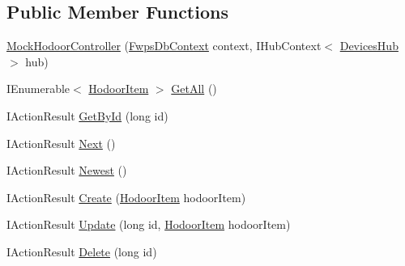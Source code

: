 \subsection*{Public Member Functions}
\begin{DoxyCompactItemize}
\item 
\mbox{\hyperlink{class_f_w_p_s_1_1_controllers_1_1_mock_hodoor_controller_a806d4077ea51a5692392f90fb0da6384}{Mock\+Hodoor\+Controller}} (\mbox{\hyperlink{class_f_w_p_s_1_1_data_1_1_fwps_db_context}{Fwps\+Db\+Context}} context, I\+Hub\+Context$<$ \mbox{\hyperlink{class_f_w_p_s_1_1_devices_hub}{Devices\+Hub}} $>$ hub)
\item 
I\+Enumerable$<$ \mbox{\hyperlink{class_f_w_p_s_1_1_models_1_1_hodoor_item}{Hodoor\+Item}} $>$ \mbox{\hyperlink{class_f_w_p_s_1_1_controllers_1_1_mock_hodoor_controller_a503cc2c82dc1892cc9c0358054b6b5df}{Get\+All}} ()
\item 
I\+Action\+Result \mbox{\hyperlink{class_f_w_p_s_1_1_controllers_1_1_mock_hodoor_controller_add58a70760f00b53f829d93057e7cff0}{Get\+By\+Id}} (long id)
\item 
I\+Action\+Result \mbox{\hyperlink{class_f_w_p_s_1_1_controllers_1_1_mock_hodoor_controller_a58c25ec4850b5c078ba684d3c5c18341}{Next}} ()
\item 
I\+Action\+Result \mbox{\hyperlink{class_f_w_p_s_1_1_controllers_1_1_mock_hodoor_controller_ae87240e17b820c203ca8563ca46a598f}{Newest}} ()
\item 
I\+Action\+Result \mbox{\hyperlink{class_f_w_p_s_1_1_controllers_1_1_mock_hodoor_controller_a5c7260d565b73f5aad4dc5cc408a8dc0}{Create}} (\mbox{\hyperlink{class_f_w_p_s_1_1_models_1_1_hodoor_item}{Hodoor\+Item}} hodoor\+Item)
\item 
I\+Action\+Result \mbox{\hyperlink{class_f_w_p_s_1_1_controllers_1_1_mock_hodoor_controller_a094bcc198643c2097f99ef9c21dd40da}{Update}} (long id, \mbox{\hyperlink{class_f_w_p_s_1_1_models_1_1_hodoor_item}{Hodoor\+Item}} hodoor\+Item)
\item 
I\+Action\+Result \mbox{\hyperlink{class_f_w_p_s_1_1_controllers_1_1_mock_hodoor_controller_acc10e4e343e001fa52671c3863798652}{Delete}} (long id)
\end{DoxyCompactItemize}
